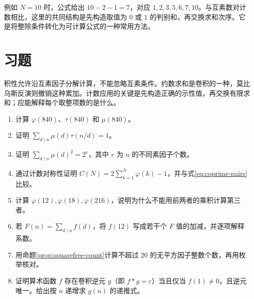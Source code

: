 例如 $N=10$ 时，公式给出 $10-2-1=7$，对应 $1,2,3,5,6,7,10$。与互素数对计数相比，这里的共同结构是先构造取值为 $0$ 或 $1$ 的判别和，再交换求和次序。它是将整除条件转化为可计算公式的一种常用方法。

\section{习题}

积性允许沿互素因子分解计算，不能忽略互素条件。约数求和是卷积的一种，莫比乌斯反演则撤销这种累加。计数应用的关键是先构造正确的示性值，再交换有限求和；应能解释每个取整项数的是什么。

\begin{enumerate}
 \item 计算 $\varphi(840)$、$\tau(840)$ 和 $\mu(840)$。
 \item 证明 $\sum_{d\mid n}\mu(d)\tau(n/d)=1$。
 \item 证明 $\sum_{d\mid n}\mu(d)^2=2^r$，其中 $r$ 为 $n$ 的不同素因子个数。
 \item 通过计数对称性证明 $C(N)=2\sum_{k=1}^N\varphi(k)-1$，并与式\eqref{eq:coprime-pairs}比较。
 \item\label{ex:arith-noncoprime} 计算 $\varphi(12),\varphi(18),\varphi(216)$，说明为什么不能用前两者的乘积计算第三者。
 \item\label{ex:arith-invert-twelve} 若 $F(n)=\sum_{d\mid n}f(d)$，将 $f(12)$ 写成若干个 $F$ 值的加减，并逐项解释系数。
 \item\label{ex:arith-squarefree} 用命题\ref{prop:squarefree-count}计算不超过 $20$ 的无平方因子整数个数，再用枚举核对。
 \item\label{ex:arith-inverse} 证明算术函数 $f$ 存在卷积逆元 $g$（即 $f*g=\varepsilon$）当且仅当 $f(1)\ne0$，且逆元唯一。给出按 $n$ 递增求 $g(n)$ 的递推式。
\end{enumerate}

